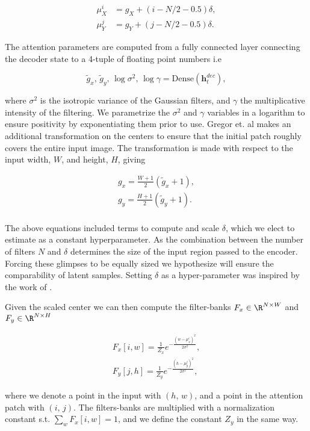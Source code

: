  \begin{align}
 \mu_X^i &= g_X + (i - N/2-0.5)\delta, \\
 \mu_Y^j &= g_Y + (j - N/2-0.5)\delta.
 \end{align}

\noindent The attention parameters are computed from a fully connected layer connecting the decoder state to a 4-tuple of floating point numbers i.e

\begin{equation}\label{eq:draw_params}
\tilde{g}_x, \,\tilde{g}_y, \, \log \sigma^2, \, \log \gamma = \text{Dense} (\mathbf{h}_t^{dec}),
\end{equation}

\noindent where $\sigma^2$ is the isotropic variance of the Gaussian filters, and $\gamma$ the multiplicative intensity of the filtering. We parametrize the $\sigma^2$ and $\gamma$ variables in a logarithm to ensure positivity by exponentiating them prior to use. Gregor et. al makes an additional transformation on the centers to ensure that the initial patch roughly covers the entire input image. The transformation is made with respect to the input width, $W$, and height, $H$, giving

\begin{align}
g_x = \frac{W +1 }{2} (\tilde{g}_x +1 ), \\
g_y = \frac{H +1 }{2} (\tilde{g}_y +1 ). \\
\end{align}

\noindent The above equations included terms to compute and scale $\delta$, which we elect to estimate as a constant hyperparameter. As the combination between the number of filters $N$ and $\delta$ determines the size of the input region passed to the encoder. Forcing these glimpses to be equally sized we hypothesize will ensure the comparability of latent samples. Setting $\delta$ as a hyper-parameter was inspired by the work of \citet{Harris2019}.

Given the scaled center we can then compute the filter-banks $F_x \in \R^{N \times W}$ and $F_y \in \R^{N \times H}$

\begin{align}
F_x [i, w] = \frac{1}{Z_x}e^{-\frac{(w - \mu_x^i)^2}{2\sigma^2}},\label{eq:Fx} \\
F_y [j, h] = \frac{1}{Z_y}e^{-\frac{(h - \mu_y^j)^2}{2\sigma^2}},\label{eq:Fy}
\end{align}

\noindent where we denote a point in the input with $(h,\, w)$, and a point in the attention patch with $(i,\, j)$. The filters-banks are multiplied with a normalization constant s.t. $\sum_w F_x[i, w] = 1$, and we define the constant $Z_y$ in the same way. 

